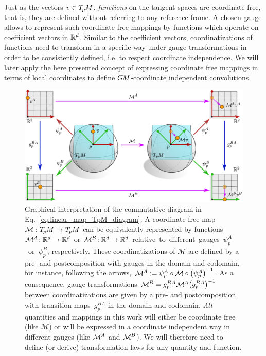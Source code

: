 Just as the vectors $v\in T_{\mkern-1.5mu p}\mkern-.5muM$, \emph{functions} on the tangent spaces are coordinate free, that is, they are defined without referring to any reference frame.
A chosen gauge allows to represent such coordinate free mappings by functions which operate on coefficient vectors in $\mathbb{R}^d$.
Similar to the coefficient vectors, coordinatizations of functions need to transform in a specific way under gauge transformations in order to be consistently defined, i.e. to respect coordinate independence.
We will later apply the here presented concept of expressing coordinate free mappings in terms of local coordinates to define $G\mkern-1.4muM$-coordinate independent convolutions.

\begin{figure}
    \centering
    \includegraphics[width=\columnwidth]{figures/gauges_TpM_functions.pdf}
    \vspace*{.5ex}
    \caption{\small
            Graphical interpretation of the commutative diagram in Eq.~\eqref{eq:linear_map_TpM_diagram}.
            A coordinate free map $\mathcal{M}: T_{\mkern-1.5mu p}\mkern-.5muM \to T_{\mkern-1.5mu p}\mkern-.5muM$ can be equivalently represented by functions $\mathcal{M}^{\mkern-1mu A}\!: \mathbb{R}^d \to \mathbb{R}^d$ or $\mathcal{M}^{\mkern-1mu B}\!: \mathbb{R}^d \to \mathbb{R}^d$ \mbox{relative to different gauges $\psi_p^A$ or~$\psi_p^B$,} respectively.
            These coordinatizations of $\mathcal{M}$ are defined by a pre- and postcomposition with gauges in the domain and codomain, for instance, following the arrows, $\mathcal{M}^{\mkern-1mu A} := \psi_p^A \circ \mathcal{M} \circ \big(\psi_p^A\big)^{-1}$.
            As a consequence, gauge transformations $\mathcal{M}^{\mkern-1mu B} = g_p^{BA} \mathcal{M}^{\mkern-1mu A} \big(g_p^{BA}\big)^{-1}$ between coordinatizations are given by a pre- and postcomposition with transition maps~$g_p^{BA}$ in the domain and codomain.
            \emph{All} quantities and mappings in this work will either be coordinate free (like $\mathcal{M}$) or will be expressed in a coordinate independent way in different gauges (like $\mathcal{M}^{\mkern-1mu A}$ and $\mathcal{M}^{\mkern-1mu B}$).
            We will therefore need to define (or derive) transformation laws for any quantity and function.
        }
    \label{fig:gauge_trafos_functions}
\end{figure}


